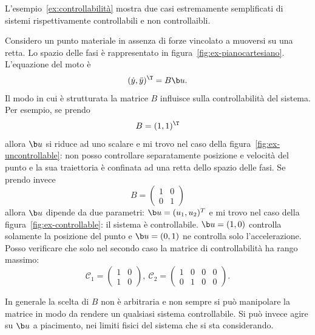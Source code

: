 L'esempio~\ref{ex:controllabilità} mostra due casi estremamente semplificati
di sistemi rispettivamente controllabili e non controllaibli.
\begin{example}
    Considero un punto materiale in assenza di forze vincolato a muoversi su una retta.
    Lo spazio delle fasi è rappresentato in figura~\ref{fig:ex-pianocartesiano}.
    L'equazione del moto è
    \begin{equation*}
        (\dot y, \ddot y)^\T = B\b u.
    \end{equation*}
    Il modo in cui è strutturata la matrice $B$ influisce sulla controllabilità del sistema.
    Per esempio, se prendo
    \begin{equation*}
        B = (1, 1)^{\T}
    \end{equation*}
    allora $\b u$ si riduce ad uno scalare e
    mi trovo nel caso della figura~\ref{fig:ex-uncontrollable}: non posso
    controllare separatamente posizione e velocità del punto e la sua traiettoria
    è confinata ad una retta dello spazio delle fasi.
    Se prendo invece
    \begin{equation*}
        B = \left(
        \begin{array}{cc}
            1 & 0 \\
            0 & 1
        \end{array}
        \right)
    \end{equation*}
    allora $\b u$ dipende da due parametri: $\b u = (u_1, u_2)^T$ e mi trovo
    nel caso della figura~\ref{fig:ex-controllable}: il sistema
    è controllabile. $\b u = (1, 0)$ controlla solamente la posizione del punto
    e $\b u = (0, 1)$ ne controlla solo l'accelerazione.
    Posso verificare che solo nel secondo caso la matrice di controllabilità
    ha rango massimo:
    \begin{equation*}
        \mathcal C_1 = \left(
        \begin{array}{cc}
            1 & 0 \\
            1 & 0
        \end{array}
        \right), \
        \mathcal C_2 = \left(
        \begin{array}{cccc}
            1 & 0 & 0 & 0\\
            0 & 1 & 0 & 0
        \end{array}
        \right).
    \end{equation*}

    In generale la scelta di $B$ non è arbitraria e non sempre si può
    manipolare la matrice in modo da rendere un qualsiasi sistema controllabile.
    Si può invece agire su $\b u$ a piacimento, nei limiti fisici del sistema
    che si sta considerando.


\end{example}
